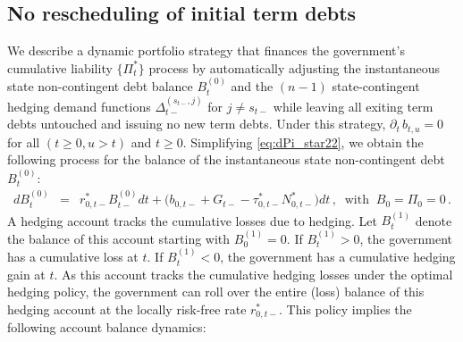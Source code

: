 \documentclass[12pt]{article}
\newcommand{\NW}[1]{{\textcolor{blue}{#1}}}
\begin{document}
\subsection{No rescheduling of initial term debts}\label{subsec:financing2}


We describe a  dynamic portfolio strategy that finances  the government's cumulative liability $\{\Pi_t^*\}$ process by automatically adjusting the instantaneous state non-contingent debt balance $B^{(0)}_t $ and  the $(n-1)$ state-contingent hedging demand functions $	\Delta_{t-}^{(s_{t-}, j)}$ for $j\neq s_{t-}$ while leaving all exiting term debts untouched and issuing no new term debts.
Under this strategy,  $\partial_t\, b_{t, u}=0$ for all $(t\geq 0, u> t)$ and $t\geq 0$.  Simplifying \eqref{eq:dPi_star22}, we obtain the following process for the balance of the instantaneous state non-contingent debt $B_t^{(0)}$: %
\begin{eqnarray} \label{finB}
d B^{(0)}_t  %
& = &   {r_{0,t-}^*} B_{t-}^{(0)} d t  + \big(b_{0, t-} +G_{t-}-\tau_{0, t-} ^\ast N_{0, t-}^\ast\big)dt   \, , \;\; \text{with}\; \; B_{0}=\Pi_0 = 0\, .  %
\end{eqnarray} %
A  hedging account tracks the cumulative losses due to hedging.  Let $B^{(1)}_t $ denote the balance of this account starting with $B^{(1)}_{0}=0$. If $B^{(1)}_t>0$, the government has a cumulative loss at $t$. If $B^{(1)}_t<0$, the government has a cumulative hedging gain at $t$. 
As  this account tracks the cumulative hedging  losses under the optimal hedging policy,  the government  can roll over the entire (loss) balance of this hedging account at the locally risk-free rate $r_{0,t-}^\ast$. This policy implies the following account balance dynamics:  
\end{document}
